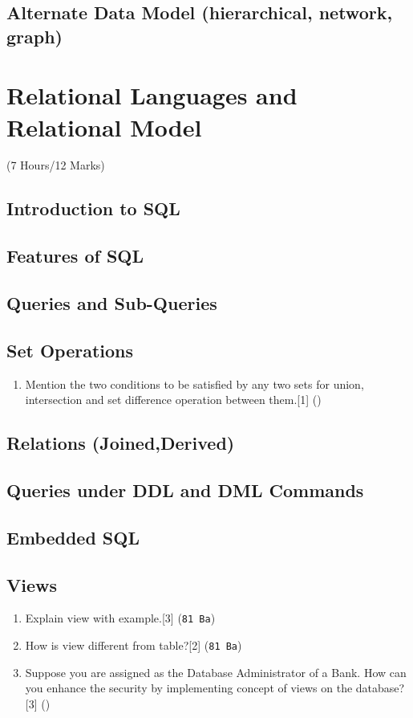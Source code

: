 \documentclass[12pt]{article}
\begin{document}
    \subsection{Alternate Data Model (hierarchical, network, graph)}

    \pagebreak
\section{Relational Languages and Relational Model}
    \begin{center}(7 Hours/12 Marks)\end{center}
    \subsection{Introduction to SQL}
    \subsection{Features of SQL}
    \subsection{Queries and Sub-Queries}
    \subsection{Set Operations}
    \begin{enumerate}
        \item Mention the two conditions to be satisfied by any two sets for union, intersection and set difference operation between them.\hfill[1] ()
    \end{enumerate}
    \subsection{Relations (Joined,Derived)}
    \subsection{Queries under DDL and DML Commands}
    \subsection{Embedded SQL}
    \subsection{Views}
    \begin{enumerate}
        \item Explain view with example.\hfill [3] (\texttt{81 Ba})
        \item How is view different from table?\hfill [2] (\texttt{81 Ba})
        \item Suppose you are assigned as the Database Administrator of a Bank. How can you enhance the security by implementing concept of views on the database?\hfill[3] ()
    \end{enumerate}
\end{document}
